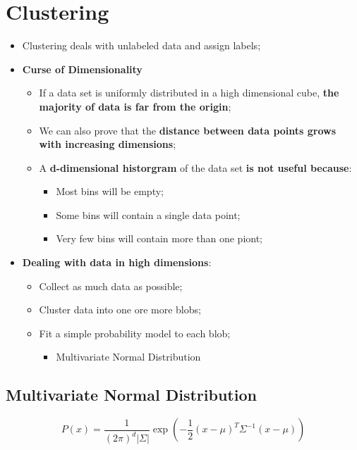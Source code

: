 \chapter{Clustering}

\begin{itemize}
  \item Clustering deals with unlabeled data and assign labels;
  \item \textbf{Curse of Dimensionality}
  \begin{itemize}
    \item If a data set is uniformly distributed in a high dimensional cube, \textbf{the majority of data is far from the origin};
    \item We can also prove that the \textbf{distance between data points grows with increasing dimensions};
    \item A \textbf{d-dimensional historgram} of the data set \textbf{is not useful because}:
    \begin{itemize}
      \item Most bins will be empty;
      \item Some bins will contain a single data point;
      \item Very few bins will contain more than one piont;
    \end{itemize}
  \end{itemize}
  
  \item \textbf{Dealing with data in high dimensions}:
  \begin{itemize}
    \item Collect as much data as possible;
    \item Cluster data into one ore more blobs;
    \item Fit a simple probability model to each blob;
    \begin{itemize}
      \item Multivariate Normal Distribution
    \end{itemize}
  \end{itemize}
\end{itemize}

\section{Multivariate Normal Distribution}

  \begin{equation}
    P\left( x \right) = \frac{1}{ \left( 2\pi \right)^{d} \left| \Sigma \right| } \exp\left( -\frac{1}{2} \left( x - \mu \right)^{T} \Sigma^{-1} \left( x - \mu \right) \right)
  \end{equation}

